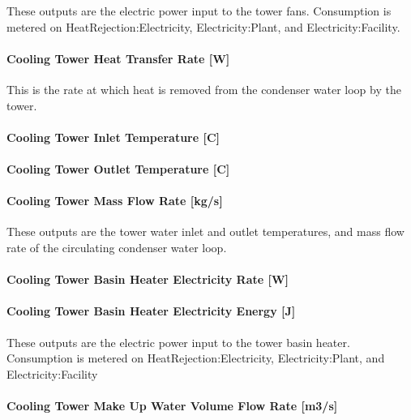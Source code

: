 These outputs are the electric power input to the tower fans. Consumption is metered on HeatRejection:Electricity, Electricity:Plant, and Electricity:Facility.

\paragraph{Cooling Tower Heat Transfer Rate {[}W{]}}\label{cooling-tower-heat-transfer-rate-w}

This is the rate at which heat is removed from the condenser water loop by the tower.

\paragraph{Cooling Tower Inlet Temperature {[}C{]}}\label{cooling-tower-inlet-temperature-c}

\paragraph{Cooling Tower Outlet Temperature {[}C{]}}\label{cooling-tower-outlet-temperature-c}

\paragraph{Cooling Tower Mass Flow Rate {[}kg/s{]}}\label{cooling-tower-mass-flow-rate-kgs}

These outputs are the tower water inlet and outlet temperatures, and mass flow rate of the circulating condenser water loop.

\paragraph{Cooling Tower Basin Heater Electricity Rate {[}W{]}}\label{cooling-tower-basin-heater-electric-power-w}

\paragraph{Cooling Tower Basin Heater Electricity Energy {[}J{]}}\label{cooling-tower-basin-heater-electric-energy-j}

These outputs are the electric power input to the tower basin heater. Consumption is metered on HeatRejection:Electricity, Electricity:Plant, and Electricity:Facility

\paragraph{Cooling Tower Make Up Water Volume Flow Rate {[}m3/s{]}}\label{cooling-tower-make-up-water-volume-flow-rate-m3s}

